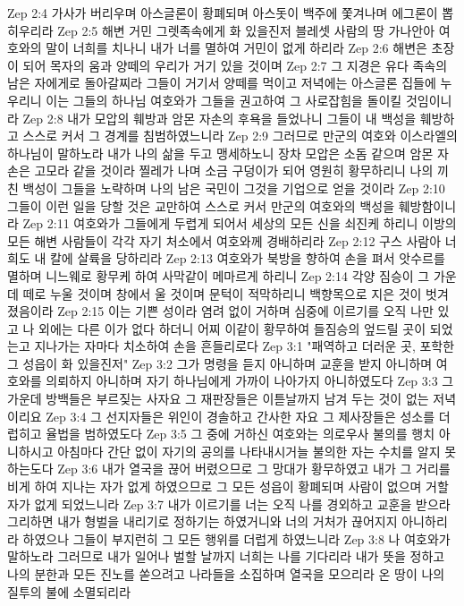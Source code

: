 Zep 2:4  가사가 버리우며 아스글론이 황폐되며 아스돗이 백주에 쫓겨나며 에그론이 뽑히우리라
Zep 2:5  해변 거민 그렛족속에게 화 있을진저 블레셋 사람의 땅 가나안아 여호와의 말이 너희를 치나니 내가 너를 멸하여 거민이 없게 하리라
Zep 2:6  해변은 초장이 되어 목자의 움과 양떼의 우리가 거기 있을 것이며
Zep 2:7  그 지경은 유다 족속의 남은 자에게로 돌아갈찌라 그들이 거기서 양떼를 먹이고 저녁에는 아스글론 집들에 누우리니 이는 그들의 하나님 여호와가 그들을 권고하여 그 사로잡힘을 돌이킬 것임이니라
Zep 2:8  내가 모압의 훼방과 암몬 자손의 후욕을 들었나니 그들이 내 백성을 훼방하고 스스로 커서 그 경계를 침범하였느니라
Zep 2:9  그러므로 만군의 여호와 이스라엘의 하나님이 말하노라 내가 나의 삶을 두고 맹세하노니 장차 모압은 소돔 같으며 암몬 자손은 고모라 같을 것이라 찔레가 나며 소금 구덩이가 되어 영원히 황무하리니 나의 끼친 백성이 그들을 노략하며 나의 남은 국민이 그것을 기업으로 얻을 것이라
Zep 2:10  그들이 이런 일을 당할 것은 교만하여 스스로 커서 만군의 여호와의 백성을 훼방함이니라
Zep 2:11  여호와가 그들에게 두렵게 되어서 세상의 모든 신을 쇠진케 하리니 이방의 모든 해변 사람들이 각각 자기 처소에서 여호와께 경배하리라
Zep 2:12  구스 사람아 너희도 내 칼에 살륙을 당하리라
Zep 2:13  여호와가 북방을 향하여 손을 펴서 앗수르를 멸하며 니느웨로 황무케 하여 사막같이 메마르게 하리니
Zep 2:14  각양 짐승이 그 가운데 떼로 누울 것이며 창에서 울 것이며 문턱이 적막하리니 백향목으로 지은 것이 벗겨졌음이라
Zep 2:15  이는 기쁜 성이라 염려 없이 거하며 심중에 이르기를 오직 나만 있고 나 외에는 다른 이가 없다 하더니 어찌 이같이 황무하여 들짐승의 엎드릴 곳이 되었는고 지나가는 자마다 치소하여 손을 흔들리로다
Zep 3:1  "패역하고 더러운 곳, 포학한 그 성읍이 화 있을진저"
Zep 3:2  그가 명령을 듣지 아니하며 교훈을 받지 아니하며 여호와를 의뢰하지 아니하며 자기 하나님에게 가까이 나아가지 아니하였도다
Zep 3:3  그 가운데 방백들은 부르짖는 사자요 그 재판장들은 이튿날까지 남겨 두는 것이 없는 저녁 이리요
Zep 3:4  그 선지자들은 위인이 경솔하고 간사한 자요 그 제사장들은 성소를 더럽히고 율법을 범하였도다
Zep 3:5  그 중에 거하신 여호와는 의로우사 불의를 행치 아니하시고 아침마다 간단 없이 자기의 공의를 나타내시거늘 불의한 자는 수치를 알지 못하는도다
Zep 3:6  내가 열국을 끊어 버렸으므로 그 망대가 황무하였고 내가 그 거리를 비게 하여 지나는 자가 없게 하였으므로 그 모든 성읍이 황폐되며 사람이 없으며 거할 자가 없게 되었느니라
Zep 3:7  내가 이르기를 너는 오직 나를 경외하고 교훈을 받으라 그리하면 내가 형벌을 내리기로 정하기는 하였거니와 너의 거처가 끊어지지 아니하리라 하였으나 그들이 부지런히 그 모든 행위를 더럽게 하였느니라
Zep 3:8  나 여호와가 말하노라 그러므로 내가 일어나 벌할 날까지 너희는 나를 기다리라 내가 뜻을 정하고 나의 분한과 모든 진노를 쏟으려고 나라들을 소집하며 열국을 모으리라 온 땅이 나의 질투의 불에 소멸되리라
